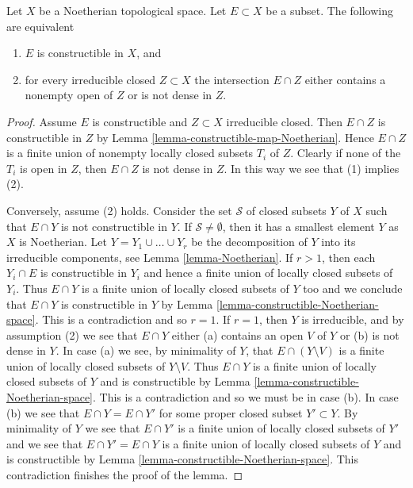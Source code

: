 \begin{lemma}
\label{lemma-characterize-constructible-Noetherian}
Let $X$ be a Noetherian topological space.
Let $E \subset X$ be a subset.
The following are equivalent
\begin{enumerate}
\item $E$ is constructible in $X$, and
\item for every irreducible closed $Z \subset X$ the intersection
$E \cap Z$ either contains a nonempty open of $Z$ or is not dense in $Z$.
\end{enumerate}
\end{lemma}

\begin{proof}
Assume $E$ is constructible and $Z \subset X$ irreducible closed.
Then $E \cap Z$ is constructible in $Z$ by
Lemma \ref{lemma-constructible-map-Noetherian}.
Hence $E \cap Z$ is a finite union of nonempty locally closed subsets
$T_i$ of $Z$. Clearly if none of the $T_i$ is open in $Z$, then
$E \cap Z$ is not dense in $Z$. In this way we see that (1) implies (2).

\medskip\noindent
Conversely, assume (2) holds. Consider the set $\mathcal{S}$ of closed
subsets $Y$ of $X$ such that $E \cap Y$ is not constructible in $Y$.
If $\mathcal{S} \not = \emptyset$, then it has a smallest element $Y$
as $X$ is Noetherian.
Let $Y = Y_1 \cup \ldots \cup Y_r$ be the decomposition of $Y$ into its
irreducible components, see
Lemma \ref{lemma-Noetherian}.
If $r > 1$, then each $Y_i \cap E$ is constructible in $Y_i$ and hence
a finite union of locally closed subsets of $Y_i$. Thus $E \cap Y$
is a finite union of locally closed subsets of $Y$ too and we conclude
that $E \cap Y$ is constructible in $Y$ by
Lemma \ref{lemma-constructible-Noetherian-space}.
This is a contradiction and so $r = 1$. If $r = 1$, then $Y$ is
irreducible, and by assumption (2) we see that $E \cap Y$ either
(a) contains an open $V$ of $Y$ or (b) is not dense in $Y$.
In case (a) we see, by minimality of $Y$, that $E \cap (Y \setminus V)$
is a finite union of locally closed subsets of $Y \setminus V$. Thus
$E \cap Y$ is a finite union of locally closed subsets of $Y$ and is
constructible by
Lemma \ref{lemma-constructible-Noetherian-space}.
This is a contradiction and so we must be in case (b).
In case (b) we see that $E \cap Y = E \cap Y'$ for some proper closed
subset $Y' \subset Y$. By minimality of $Y$ we see that
$E \cap Y'$ is a finite union of locally closed subsets of $Y'$ and
we see that $E \cap Y' = E \cap Y$ is a finite union of locally closed
subsets of $Y$ and is constructible by
Lemma \ref{lemma-constructible-Noetherian-space}.
This contradiction finishes the proof of the lemma.
\end{proof}

